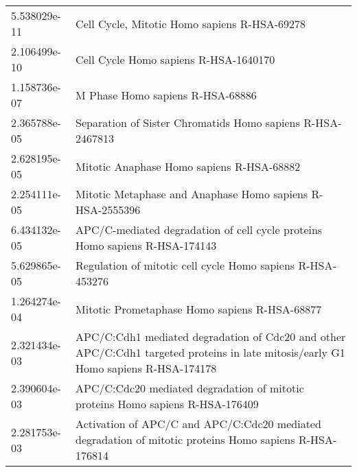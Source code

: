 \begin{longtable}{p{2.4cm}p{14.5cm}}
\bottomrule
\endlastfoot
             5.538029e-11 &                                                                                                           Cell Cycle, Mitotic Homo sapiens R-HSA-69278 \\
             2.106499e-10 &                                                                                                                  Cell Cycle Homo sapiens R-HSA-1640170 \\
             1.158736e-07 &                                                                                                                       M Phase Homo sapiens R-HSA-68886 \\
             2.365788e-05 &                                                                                             Separation of Sister Chromatids Homo sapiens R-HSA-2467813 \\
             2.628195e-05 &                                                                                                              Mitotic Anaphase Homo sapiens R-HSA-68882 \\
             2.254111e-05 &                                                                                              Mitotic Metaphase and Anaphase Homo sapiens R-HSA-2555396 \\
             6.434132e-05 &                                                                            APC/C-mediated degradation of cell cycle proteins Homo sapiens R-HSA-174143 \\
             5.629865e-05 &                                                                                             Regulation of mitotic cell cycle Homo sapiens R-HSA-453276 \\
             1.264274e-04 &                                                                                                          Mitotic Prometaphase Homo sapiens R-HSA-68877 \\
             2.321434e-03 &                     APC/C:Cdh1 mediated degradation of Cdc20 and other APC/C:Cdh1 targeted proteins in late mitosis/early G1 Homo sapiens R-HSA-174178 \\
             2.390604e-03 &                                                                         APC/C:Cdc20 mediated degradation of mitotic proteins Homo sapiens R-HSA-176409 \\
             2.281753e-03 &                                                 Activation of APC/C and APC/C:Cdc20 mediated degradation of mitotic proteins Homo sapiens R-HSA-176814 \\

\end{longtable}
